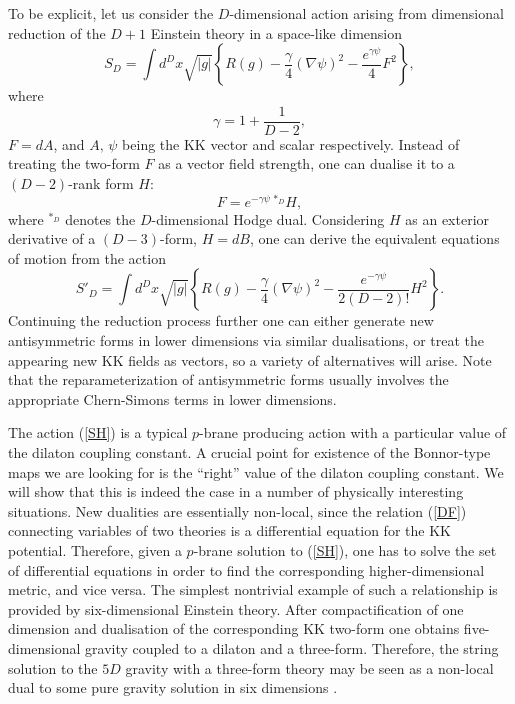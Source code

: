 \documentclass[a4paper,12pt]{article}
\begin{document}
To be explicit, let us consider the $D$-dimensional action
arising from dimensional reduction of the $D+1$ Einstein theory
in a space-like dimension
\begin{equation}\label{SF}
S_{D} = \int d^D x \sqrt{|g|} \left\{ R(g) -
\frac{\gamma}4(\nabla\psi)^2 - \frac{e^{\gamma\psi}}4 F^2
\right\},
\end{equation}
where
\begin{equation}
\gamma = 1 + \frac1{D-2},
\end{equation}
$F=dA$, and $A,\,\psi$ being the KK vector and scalar
respectively. Instead of treating the two-form $F$ as a vector
field strength, one can dualise it to a $(D-2)$-rank form $H$:
\begin{equation} \label{DF}
F = e^{-\gamma\psi}\,{}^{*_D}H,
\end{equation}
where ${}^{*_D}$ denotes the $D$-dimensional Hodge dual.
Considering $H$ as an exterior derivative of a $(D-3)$-form,
$H=dB$, one can derive the equivalent equations of motion from
the action
\begin{equation} \label{SH}
S'_{D} = \int d^Dx \sqrt{|g|} \left\{ R(g) -
\frac{\gamma}4(\nabla\psi)^2 - \frac{e^{-\gamma\psi}}{2(D-2)!}
H^2 \right\}.
\end{equation}
Continuing the reduction process further one can either generate
new antisymmetric forms in lower dimensions via similar
dualisations, or treat the appearing new KK fields as vectors, so
a variety of alternatives will arise. Note that the
reparameterization of antisymmetric forms usually involves the
appropriate Chern-Simons terms in lower dimensions.

The action (\ref{SH}) is a typical $p$-brane producing action
with a particular value of the dilaton coupling constant. A
crucial point for existence of the Bonnor-type maps we are
looking for is the ``right'' value of the dilaton coupling
constant. We will show that this is indeed the case in a number
of physically interesting situations. New dualities are
essentially non-local, since the relation (\ref{DF}) connecting
variables of two theories is a differential equation for the KK
potential. Therefore, given a $p$-brane solution to (\ref{SH}),
one has to solve the set of differential equations in order to
find the corresponding higher-dimensional metric, and vice
versa. The simplest nontrivial example of such a relationship is
provided by six-dimensional Einstein theory. After
compactification of one dimension and dualisation of the
corresponding KK two-form one obtains five-dimensional gravity
coupled to a dilaton and a three-form. Therefore, the string
solution to the $5D$ gravity with a three-form theory may be
seen as a non-local dual to some pure gravity solution in six
dimensions \cite{ChGaMaSh99}.
\end{document}
